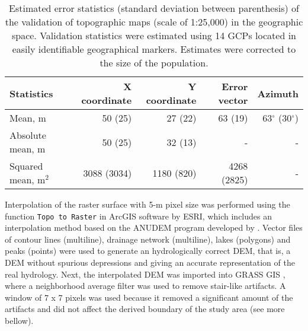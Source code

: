 \begin{table}[ht]
  \caption{Estimated error statistics (standard deviation between parenthesis) of the validation of topographic maps (scale of 1:25,000) in the geographic space. Validation statistics were estimated using 14 GCPs located in easily identifiable geographical markers. Estimates were corrected to the size of the population.}
  \label{tab:topomap-geo-val}
  \centering
  {\small
  \begin{tabular}{lrrrr}
    \hline
    Statistics          & X coordinate & Y coordinate & Error vector & Azimuth                 \\
    \hline
    Mean, m             & 50   (25)    & 27   (22)    & 63   (19)    & 63$^\circ$ (30$^\circ$) \\ 
    Absolute mean, m    & 50   (25)    & 32   (13)    & -            & -                       \\ 
    Squared mean, m$^2$ & 3088 (3034)  & 1180 (820)   & 4268 (2825)  & -                       \\ 
    \hline
  \end{tabular}}
\end{table}


Interpolation of the raster surface with 5-m pixel size was performed using the function \texttt{Topo to Raster} in ArcGIS\textregistered{} software by ESRI, which includes an interpolation method based on the ANUDEM program developed by \cite{Hutchinson1989}. Vector files of contour lines (multiline), drainage network (multiline), lakes (polygons) and peaks (points) were used to generate an hydrologically correct DEM, that is, a DEM without spurious depressions and giving an accurate representation of the real hydrology. Next, the interpolated DEM was imported into GRASS GIS \citep{GRASS2012}, where a neighborhood average filter was used to remove stair-like artifacts. A window of 7 x 7 pixels was used because it removed a significant amount of the artifacts and did not affect the derived boundary of the study area (see more bellow).


